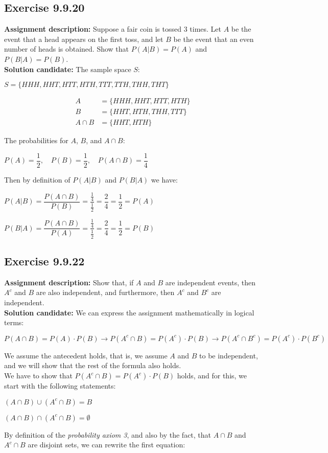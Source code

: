 \documentclass{report}
\newcommand{\cent}[1]{\begin{center}#1\end{center}}
\newcommand{\mAlign}[1]{\begin{align*}#1\end{align*}}
\newcommand{\AssignmentDescription}{\textbf{Assignment description: }}
\newcommand{\Solution}{\textbf{Solution candidate: }}
\newcommand{\Exercise}[1]{\subsection{Exercise #1}}
\begin{document}
 	\Exercise{9.9.20}
 	\AssignmentDescription
 	Suppose a fair coin is tossed 3 times. Let $A$ be the event that a head appears on the first toss, and let $B$ be the event that an even number of heads  is obtained. Show that $P(A | B) = P(A)$ and $P(B | A) = P(B)$.\\
 	
 	\Solution
 	The sample space $S$:
 	\cent{$S = \{HHH,HHT,HTT,HTH, TTT,TTH,THH,THT\}$}
 	
 	\mAlign{
 		A &= \{HHH,HHT,HTT,HTH\} \\
 		B &= \{HHT,HTH,THH,TTT\} \\
 		A \cap B &= \{HHT,HTH\}
 	}
 	
 	The probabilities for $A$, $B$, and $A \cap B$:
 	\cent{$P(A) = \dfrac{1}{2}, \quad P(B) = \dfrac{1}{2}, \quad P(A \cap B) = \dfrac{1}{4}$}
 	
 	Then by definition of $P(A|B)$ and $P(B | A)$ we have:
 	
 	\cent{$P(A | B) = \dfrac{P(A \cap B)}{P(B)} = \dfrac{\frac{1}{4}}{\frac{1}{2}} = \dfrac{2}{4} = \dfrac{1}{2} = P(A)$}
 	
 	\cent{$P(B | A) = \dfrac{P(A \cap B)}{P(A)} = \dfrac{\frac{1}{4}}{\frac{1}{2}} = \dfrac{2}{4} = \dfrac{1}{2} = P(B)$}
 	
 	\Exercise{9.9.22}
 	
 	\AssignmentDescription
 	Show that, if  $A$ and $B$ are independent events, then $A^c$ and $B$ are also independent, and furthermore,  then $A^c$ and $B^c$ are independent.\\
 	
 	\Solution
 	We can express the assignment mathematically in logical terms:
 	
 	\cent{$P(A \cap B) = P(A) \cdot P(B) \to P(A^c \cap B) = P(A^c) \cdot P(B) \to P(A^c \cap B^c) = P(A^c ) \cdot P(B^c)$}
 	
 	We assume the antecedent holds, that is, we assume $A$ and $B$ to be independent, and we will show that the rest of the formula also holds.\\
 	
 	We have to show that $P(A^c \cap B) = P(A^c) \cdot P(B)$ holds, and for this, we start with the following statements:
 	
 	\cent{$(A \cap B) \cup (A^c \cap B) = B$}
 	\cent{$(A \cap B) \cap (A^c \cap B) = \emptyset$}
 	
 	By definition of the \textit{probability axiom 3}, and also by the fact, that $A \cap B$ and $A^c \cap B$ are disjoint sets,  we can rewrite the first equation:
 	
\end{document}
